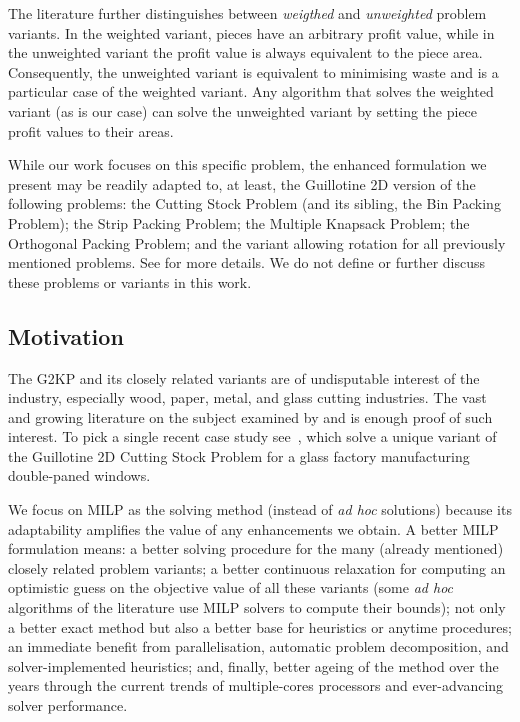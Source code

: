 \documentclass[smallextended]{svjour3}       %
\begin{document}
The literature further distinguishes between \emph{weigthed} and \emph{unweighted} problem variants.
In the weighted variant, pieces have an arbitrary profit value, while in the unweighted variant the profit value is always equivalent to the piece area.
Consequently, the unweighted variant is equivalent to minimising waste and is a particular case of the weighted variant.
Any algorithm that solves the weighted variant (as is our case) can solve the unweighted variant by setting the piece profit values to their areas.

While our work focuses on this specific problem, the enhanced formulation we present may be readily adapted to, at least, the Guillotine 2D version of the following problems: the Cutting Stock Problem (and its sibling, the Bin Packing Problem); the Strip Packing Problem; the Multiple Knapsack Problem; the Orthogonal Packing Problem; and the variant allowing rotation for all previously mentioned problems.
See \cite{furini:2016} for more details.
We do not define or further discuss these problems or variants in this work.

\subsection{Motivation}

The G2KP and its closely related variants are of undisputable interest of the industry, especially wood, paper, metal, and glass cutting industries.
The vast and growing literature on the subject examined by \cite{iori:2020} and \cite{russo:2020} is enough proof of such interest.
To pick a single recent case study see~\cite{clautiaux:2019}, which solve a unique variant of the Guillotine 2D Cutting Stock Problem for a glass factory manufacturing double-paned windows.

We focus on MILP as the solving method (instead of \emph{ad hoc} solutions) because its adaptability amplifies the value of any enhancements we obtain.
A better MILP formulation means:
a better solving procedure for the many (already mentioned) closely related problem variants;
a better continuous relaxation for computing an optimistic guess on the objective value of all these variants (some \emph{ad hoc} algorithms of the literature use MILP solvers to compute their bounds);
not only a better exact method but also a better base for heuristics or anytime procedures;
an immediate benefit from parallelisation, automatic problem decomposition, and solver-implemented heuristics;
and, finally, better ageing of the method over the years through the current trends of multiple-cores processors and ever-advancing solver performance.
\end{document}
